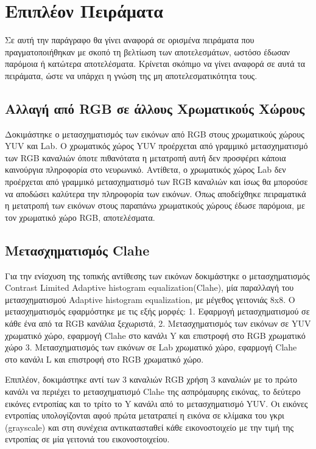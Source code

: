   



\section{Επιπλέον Πειράματα}
\label{sec:5.4}
Σε αυτή την παράγραφο θα γίνει αναφορά σε ορισμένα πειράματα  που πραγματοποιήθηκαν με σκοπό τη βελτίωση των αποτελεσμάτων, ωστόσο έδωσαν παρόμοια ή κατώτερα αποτελέσματα. Κρίνεται σκόπιμο να γίνει αναφορά σε αυτά τα πειράματα, ώστε να υπάρχει η γνώση της μη αποτελεσματικότητα τους.


\subsection{Αλλαγή από RGB σε άλλους Xρωματικούς Xώρους}
\label{subsec:5.4.1}
Δοκιμάστηκε ο μετασχηματισμός των εικόνων από RGB στους χρωματικούς χώρους YUV και Lab. Ο χρωματικός χώρος YUV προέρχεται από γραμμικό μετασχηματισμό των RGB  καναλιών όποτε πιθανότατα η μετατροπή αυτή δεν προσφέρει κάποια καινούργια πληροφορία στο νευρωνικό. Αντίθετα, ο χρωματικός χώρος Lab δεν προέρχεται από γραμμικό μετασχηματισμό των RGB καναλιών και ίσως θα μπορούσε να αποδώσει καλύτερα την πληροφορία των εικόνων.  Όπως αποδείχθηκε  πειραματικά η μετατροπή των εικόνων στους παραπάνω χρωματικούς χώρους έδωσε παρόμοια, με τον χρωματικό χώρο RGB, αποτελέσματα.

\subsection{Μετασχηματισμός Clahe}
\label{subsec:5.4.2}
Για την ενίσχυση της τοπικής αντίθεσης των εικόνων δοκιμάστηκε ο μετασχηματισμός Contrast Limited Adaptive histogram equalization(Clahe), μία παραλλαγή του μετασχηματισμού Adaptive histogram equalization, με μέγεθος γειτονιάς 8x8\cite{clahe}. Ο μετασχηματισμός εφαρμόστηκε με τις εξής μορφές: 1. Εφαρμογή μετασχηματισμού  σε κάθε ένα από τα RGB κανάλια ξεχωριστά, 2.  Μετασχηματισμός των εικόνων σε YUV χρωματικό χώρο, εφαρμογή Clahe στο κανάλι Y και επιστροφή στο RGB χρωματικό χώρο  3.  Μετασχηματισμός των εικόνων σε Lab χρωματικό χώρο, εφαρμογή Clahe στο κανάλι L και επιστροφή στο RGB χρωματικό χώρο. 

Επιπλέον, δοκιμάστηκε αντί των 3 καναλιών RGB χρήση 3 καναλιών με το πρώτο κανάλι να περιέχει το μετασχηματισμό Clahe της ασπρόμαυρης εικόνας, το δεύτερο εικόνες εντροπίας και το τρίτο το Y κανάλι από το μετασχηματισμό YUV. Οι εικόνες εντροπίας υπολογίζονται αφού πρώτα μετατραπεί η εικόνα σε κλίμακα του γκρι (grayscale) και στη συνέχεια αντικατασταθεί κάθε εικονοστοιχείο με την τιμή της εντροπίας σε μία γειτονιά του εικονοστοιχείου.

